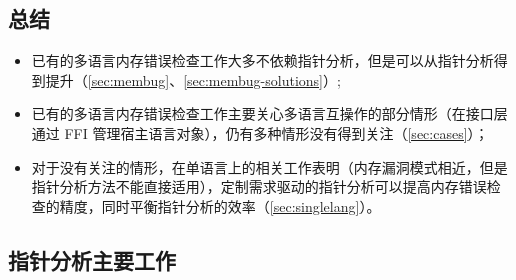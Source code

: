 \subsection{总结}

\begin{itemize}
\item 已有的多语言内存错误检查工作大多不依赖指针分析，但是可以从指针分析得到提升（\autoref{sec:membug}、\autoref{sec:membug-solutions}）;
\item 已有的多语言内存错误检查工作主要关心多语言互操作的部分情形（在接口层通过 FFI 管理宿主语言对象），仍有多种情形没有得到关注（\autoref{sec:cases}）；
\item 对于没有关注的情形，在单语言上的相关工作表明（内存漏洞模式相近，但是指针分析方法不能直接适用），定制需求驱动的指针分析可以提高内存错误检查的精度，同时平衡指针分析的效率（\autoref{sec:singlelang}）。
\end{itemize}

\subsection{指针分析主要工作}

